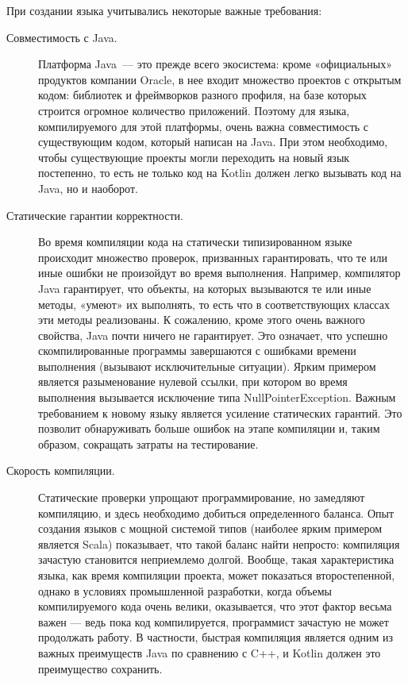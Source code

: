 При создании языка учитывались некоторые важные требования: %
\begin{description}
	\item[Совместимость с Java.] Платформа Java~--- это прежде всего экосистема: кроме «официальных» продуктов компании Oracle, в нее входит множество проектов с открытым кодом: библиотек и фреймворков разного профиля, на базе которых строится огромное количество приложений. Поэтому для языка, компилируемого для этой платформы, очень важна совместимость с существующим кодом, который написан на Java. При этом необходимо, чтобы существующие проекты могли переходить на новый язык постепенно, то есть не только код на Kotlin должен легко вызывать код на Java, но и наоборот.
	\item[Статические гарантии корректности.] Во время компиляции кода на статически типизированном языке происходит множество проверок, призванных гарантировать, что те или иные ошибки не произойдут во время выполнения. Например, компилятор Java гарантирует, что объекты, на которых вызываются те или иные методы, «умеют» их выполнять, то есть что в соответствующих классах эти методы реализованы. К сожалению, кроме этого очень важного свойства, Java почти ничего не гарантирует. Это означает, что успешно скомпилированные программы завершаются с ошибками времени выполнения (вызывают исключительные ситуации). Ярким примером является разыменование нулевой ссылки, при котором во время выполнения вызывается исключение типа NullPointerException. Важным требованием к новому языку является усиление статических гарантий. Это позволит обнаруживать больше ошибок на этапе компиляции и, таким образом, сокращать затраты на тестирование.
	\item[Скорость компиляции.] Статические проверки упрощают программирование, но замедляют компиляцию, и здесь необходимо добиться определенного баланса. Опыт создания языков с мощной системой типов (наиболее ярким примером является Scala) показывает, что такой баланс найти непросто: компиляция зачастую становится неприемлемо долгой. Вообще, такая характеристика языка, как время компиляции проекта, может показаться второстепенной, однако в условиях промышленной разработки, когда объемы компилируемого кода очень велики, оказывается, что этот фактор весьма важен — ведь пока код компилируется, программист зачастую не может продолжать работу. В частности, быстрая компиляция является одним из важных преимуществ Java по сравнению с C++, и Kotlin должен это преимущество сохранить.

\end{description}
